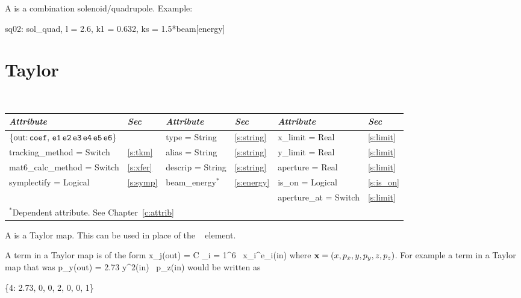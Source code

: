 {{A  is a combination solenoid/quadrupole.
Example:
\begin{example}
  sq02: sol_quad, l = 2.6, k1 = 0.632, ks = 1.5*beam[energy]
\end{example}

\section{Taylor}
\label{s:tay}

\begin{center}
\tt
\begin{tabular}{|l|l||l|l||l|l|} \hline
  {\sl Attribute} & {\sl Sec}  & {\sl Attribute} & {\sl Sec} & {\sl Attribute} & {\sl Sec} \\ \hline
  $\{ \tt \mbox{out:}\,  coef, \, e1 \, e2 \, e3 \, e4 \, e5 \, e6 \}$ 
                              &              & type = String    & \ref{s:string} & x\_limit = Real       & \ref{s:limit} \\ \hline  
  tracking\_method = Switch   & \ref{s:tkm}  & alias = String   & \ref{s:string} & y\_limit = Real       & \ref{s:limit} \\ \hline
  mat6\_calc\_method = Switch & \ref{s:xfer} & descrip = String & \ref{s:string} & aperture = Real       & \ref{s:limit} \\ \hline
  symplectify = Logical       & \ref{s:symp} & beam\_energy$^*$ & \ref{s:energy} & is\_on = Logical      & \ref{s:is_on} \\ \hline
                              &              &                  &                & aperture\_at = Switch & \ref{s:limit} \\ \hline
  \multicolumn{6}{l}{\small $^*$Dependent attribute. See Chapter~\ref{c:attrib}} \\
\end{tabular}
\end{center}
\toffset

A  is a Taylor map. This can be used in place of the \mad\ 
 element.

A term in a Taylor map is of the form
\Begineq
  x_j({\rm out}) = C \cdot \Pi_{i = 1}^6 \, x_i^{e_i}({\rm in})
\Endeq
where ${\bf x} = (x, p_x, y, p_y, z, p_z)$. For example a term
in a Taylor map that was
\Begineq
  p_y({\rm out}) = 2.73 \cdot y^2({\rm in}) \, p_z({\rm in})
\Endeq
would be written as
\begin{example}
  \{4: 2.73, 0, 0, 2, 0, 0, 1\}
\end{example}

}}
